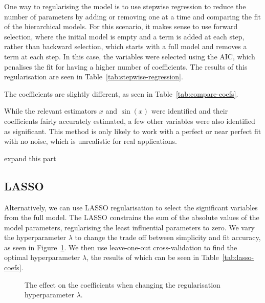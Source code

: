 One way to regularising the model is to use stepwise regression to reduce the number of parameters by adding or removing one at a time and comparing the fit of the hierarchical models.
For this scenario, it makes sense to use forward selection, where the initial model is empty and a term is added at each step, rather than backward selection, which starts with a full model and removes a term at each step.
In this case, the variables were selected using the \ac{AIC}, which penalises the fit for having a higher number of coefficients.
The results of this regularisation are seen in Table~\ref{tab:stepwise-regression}.

The coefficients are slightly different, as seen in Table~\ref{tab:compare-coefs}.


While the relevant estimators \(x\) and \(\sin(x)\) were identified and their coefficients fairly accurately estimated, a few other variables were also identified as significant.
This method is only likely to work with a perfect or near perfect fit with no noise, which is unrealistic for real applications.

\begin{todo}
	expand this part
\end{todo}

\subsection{LASSO}

Alternatively, we can use \ac{LASSO} regularisation to select the significant variables from the full model.
The \ac{LASSO} constrains the sum of the absolute values of the model parameters, regularising the least influential parameters to zero.
We vary the hyperparameter \(\lambda\) to change the trade off between simplicity and fit accuracy, as seen in Figure~\ref{fig:lasso-lambda}.
We then use leave-one-out cross-validation to find the optimal hyperparameter \(\lambda\), the results of which can be seen in Table~\ref{tab:lasso-coefs}.

\begin{figure}[htbp]
	\centering
	
	\caption{The effect on the coefficients when changing the regularisation hyperparameter \(\lambda\).}
	\label{fig:lasso-lambda}
\end{figure}

